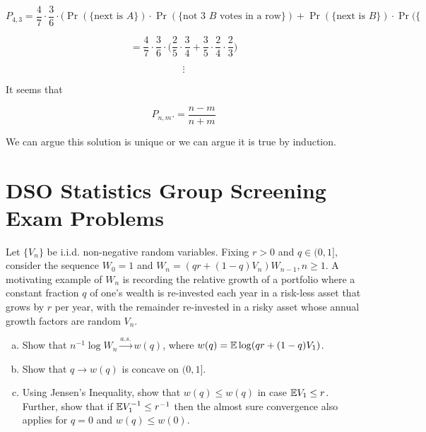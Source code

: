 \begin{solution}
\[
P_{4,3} = \frac{4}{7} \cdot \frac{3}{6} \cdot \bigg( \Pr(\{\text{next is } A\}) \cdot \Pr(\{\text{not 3 } B \text{ votes in a row}\})+ \Pr(\{\text{next is } B\}) \cdot \Pr( \{ 
\]

\[
= \frac{4}{7} \cdot \frac{3}{6} \cdot \bigg(\frac{2}{5} \cdot \frac{3}{4} + \frac{3}{5} \cdot \frac{2}{4} \cdot \frac{2}{3} \bigg) 
\]

\[
\vdots
\]

It seems that

\[
\boxed{
P_{n,m}.= \frac{n-m}{n+m}}
\]

We can argue this solution is unique or we can argue it is true by induction. 

\end{solution}

\section{DSO Statistics Group Screening Exam Problems}

\begin{exercise}

Let \(\{V_n\}\) be i.i.d. non-negative random variables. Fixing \(r > 0\) and \(q \in (0,1]\), consider the sequence \(W_0 = 1\) and \(W_n = (qr + (1-q)V_n)W_{n-1}, n \geq 1\). A motivating example of \(W_n\) is recording the relative growth of a portfolio where a constant fraction \(q\) of one's wealth is re-invested each year in a risk-less asset that grows by \(r\) per year, with the remainder re-invested in a risky asset whose annual growth factors are random \(V_n\).

\begin{enumerate}[(a)]

\item Show that \(n^{-1} \log W_n \xrightarrow{a.s.} w(q)\), where \(w(q) = \mathbb{E} \log (qr + (1-q)V_1)\).

\item Show that \(q \to w(q)\) is concave on \((0,1]\).

\item Using Jensen's Inequality, show that \(w(q) \leq w(q)\) in case \(\mathbb{E} V_1 \leq r\). Further, show that if \(\mathbb{E} V_1^{-1} \leq r^{-1}\) then the almost sure convergence also applies for \(q=0\) and \(w(q) \leq w(0)\).

\end{enumerate}

\end{exercise}

